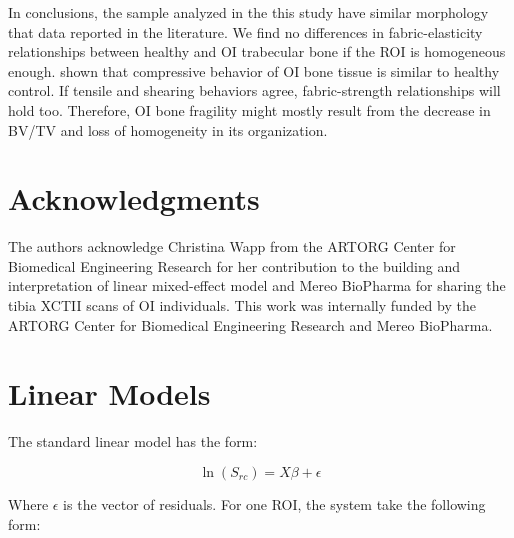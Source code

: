 \documentclass[a4paper,fleqn]{DC_ArtStyle}
\begin{document}
In conclusions, the sample analyzed in the this study have similar morphology that data reported in the literature. We find no differences in fabric-elasticity relationships between healthy and OI trabecular bone if the ROI is homogeneous enough. \citeauthor{Indermaur2021}\cite{Indermaur2021} shown that compressive behavior of OI bone tissue is similar to healthy control. If tensile and shearing behaviors agree, fabric-strength relationships will hold too. Therefore, OI bone fragility might mostly result from the decrease in BV/TV and loss of homogeneity in its organization.

\section*{Acknowledgments}
The authors acknowledge Christina Wapp from the ARTORG Center for Biomedical Engineering Research for her contribution to the building and interpretation of linear mixed-effect model and Mereo BioPharma for sharing the tibia XCTII scans of OI individuals. This work was internally funded by the ARTORG Center for Biomedical Engineering Research and Mereo BioPharma.

\clearpage
\appendix
\section{Linear Models}\label{A1}

The standard linear model has the form:

\begin{equation}
	\ln(S_{rc}) = X \beta + \epsilon
\end{equation}

Where $\epsilon$ is the vector of residuals. For one ROI, the system take the following form:
\end{document}
